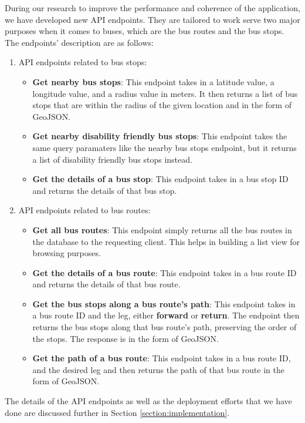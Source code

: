 During our research to improve the performance and coherence of the application, we have developed new API endpoints. They are tailored to work serve two major purposes when it comes to buses, which are the bus routes and the bus stops. The endpoints' description are as follows:
\begin{enumerate}
    \item API endpoints related to bus stops:
    \begin{itemize}
        \item \textbf{Get nearby bus stops}: This endpoint takes in a latitude value, a longitude value, and a radius value in meters. It then returns a list of bus stops that are within the radius of the given location and in the form of GeoJSON.
        \item \textbf{Get nearby disability friendly bus stops}: This endpoint takes the same query paramaters like the nearby bus stops endpoint, but it returns a list of disability friendly bus stops instead.
        \item \textbf{Get the details of a bus stop}: This endpoint takes in a bus stop ID and returns the details of that bus stop.
    \end{itemize}
    \item API endpoints related to bus routes:
    \begin{itemize}
        \item \textbf{Get all bus routes}: This endpoint simply returns all the bus routes in the database to the requesting client. This helps in building a list view for browsing purposes.
        \item \textbf{Get the details of a bus route}: This endpoint takes in a bus route ID and returns the details of that bus route.
        \item \textbf{Get the bus stops along a bus route's path}: This endpoint takes in a bus route ID and the leg, either \textbf{forward} or \textbf{return}. The endpoint then returns the bus stops along that bus route's path, preserving the order of the stops. The response is in the form of GeoJSON.
        \item \textbf{Get the path of a bus route}: This endpoint takes in a bus route ID, and the desired leg and then returns the path of that bus route in the form of GeoJSON.
    \end{itemize}
\end{enumerate}

The details of the API endpoints as well as the deployment efforts that we have done are discussed further in Section \ref{section:implementation}.


